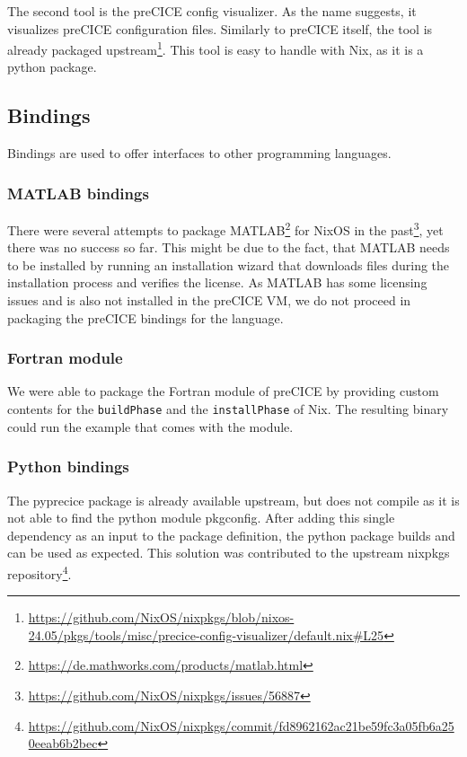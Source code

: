\documentclass{eceasst}
\begin{document}
The second tool is the preCICE config visualizer.
As the name suggests, it visualizes preCICE configuration files.
Similarly to preCICE itself, the tool is already packaged upstream\footnote{\url{https://github.com/NixOS/nixpkgs/blob/nixos-24.05/pkgs/tools/misc/precice-config-visualizer/default.nix\#L25}}.
This tool is easy to handle with Nix, as it is a python package.

\subsection{Bindings}

Bindings are used to offer interfaces to other programming languages.

\subsubsection{MATLAB bindings}

There were several attempts to package MATLAB\footnote{\url{https://de.mathworks.com/products/matlab.html}} for NixOS in the past\footnote{\url{https://github.com/NixOS/nixpkgs/issues/56887}}, yet there was no success so far.
This might be due to the fact, that MATLAB needs to be installed by running an installation wizard that downloads files during the installation process and verifies the license.
As MATLAB has some licensing issues and is also not installed in the preCICE VM, we do not proceed in packaging the preCICE bindings for the language.

\subsubsection{Fortran module}

We were able to package the Fortran module of preCICE by providing custom contents for the \texttt{buildPhase} and the \texttt{installPhase} of Nix.
The resulting binary could run the example that comes with the module.

\subsubsection{Python bindings}

The pyprecice package is already available upstream, but does not compile as it is not able to find the python module pkgconfig.
After adding this single dependency as an input to the package definition, the python package builds and can be used as expected.
This solution was contributed to the upstream nixpkgs repository\footnote{\url{https://github.com/NixOS/nixpkgs/commit/fd8962162ac21be59fc3a05fb6a250eeab6b2bec}}.
\end{document}
